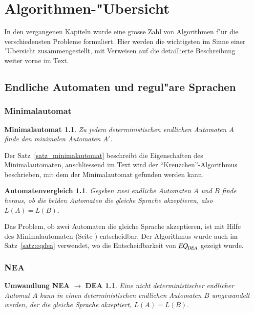 \chapter{Algorithmen-"Ubersicht\label{skript:algorithmen}}
\rhead{}
In den vergangenen Kapiteln wurde eine grosse Zahl von Algorithmen
f"ur die verschiedensten Probleme formuliert. Hier werden die wichtigsten
im Sinne einer "Ubersicht zusammengestellt, mit Verweisen auf die 
detaillierte Beschreibung weiter vorne im Text.
\section{Endliche Automaten und regul"are Sprachen}
\subsection{Minimalautomat}
\newtheorem*{Minimalautomat}{Minimalautomat}
\begin{Minimalautomat}
Zu jedem deterministischen endlichen Automaten $A$ finde den minimalen
Automaten $A'$.
\end{Minimalautomat}
Der Satz~\ref{satz_minimalautomat} beschreibt die Eigenschaften des
Minimalautomaten, anschliessend im Text wird der ``Kreuzchen''-Algorithmus
beschrieben, mit dem der Minimalautomat gefunden werden kann.

\newtheorem*{Automatenvergleich}{Automatenvergleich}
\begin{Automatenvergleich}
Gegeben zwei endliche Automaten $A$ und $B$ finde heraus, ob die
beiden Automaten die gleiche Sprache akzeptieren, also $L(A)=L(B)$.
\end{Automatenvergleich}
Das Problem, ob zwei Automaten die gleiche Sprache akzeptieren,
ist mit Hilfe des Minimalautomaten (Seite \pageref{algorithmus:minimalautomat})
entscheidbar. 
Der Algorithmus wurde auch im Satz~\ref{satz:eqdea} verwendet, wo die
Entscheidbarkeit von $\textsl{EQ}_\textsl{DEA}$ gezeigt wurde.


\subsection{NEA}
\newtheorem*{NEA}{Umwandlung NEA $\to$ DEA}
\begin{NEA}
Eine nicht deterministischer endlicher Automat $A$ kann in einen 
deterministischen endlichen Automaten $B$ umgewandelt werden, der die
gleiche Sprache akzeptiert, $L(A)=L(B)$.
\end{NEA}

